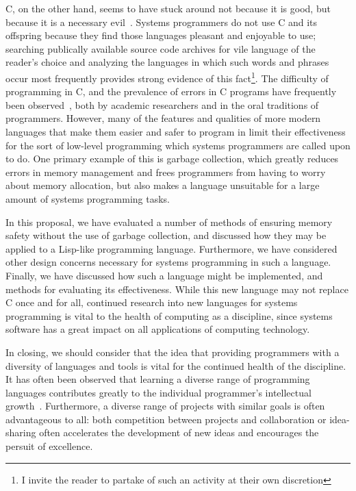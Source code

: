 \documentclass[11pt,a4paper]{article}
\theoremstyle{break}
\begin{document}
C, on the other hand, seems to have stuck around not because it is good, but because it is a necessary evil~\cite{Shapiro:2006:PLC:1215995.1216004}. Systems programmers do not use C and its offspring because they find those languages pleasant and enjoyable to use; searching publically available source code archives for vile language of the reader's choice and analyzing the languages in which such words and phrases occur most frequently provides strong evidence of this fact\footnote{I invite the reader to partake of such an activity at their own discretion}. The difficulty of programming in C, and the prevalence of errors in C programs have frequently been observed~\cite{Shapiro:2006:PLC:1215995.1216004,Bhattacharya:2011:APL:1985793.1985817,Ray:2014:LSS:2635868.2635922}, both by academic researchers and in the oral traditions of programmers. However, many of the features and qualities of more modern languages that make them easier and safer to program in limit their effectiveness for the sort of low-level programming which systems programmers are called upon to do. One primary example of this is garbage collection, which greatly reduces errors in memory management and frees programmers from having to worry about memory allocation, but also makes a language unsuitable for a large amount of systems programming tasks.

In this proposal, we have evaluated a number of methods of ensuring memory safety without the use of garbage collection, and discussed how they may be applied to a Lisp-like programming language. Furthermore, we have considered other design concerns necessary for systems programming in such a language. Finally, we have discussed how such a language might be implemented, and methods for evaluating its effectiveness. While this new language may not replace C once and for all, continued research into new languages for systems programming is vital to the health of computing as a discipline, since systems software has a great impact on all applications of computing technology.

In closing, we should consider that the idea that providing programmers with a diversity of languages and tools is vital for the continued health of the discipline. It has often been observed that learning a diverse range of programming languages contributes greatly to the individual programmer's intellectual growth~\cite{raymond2003become,norvig2001teach}. Furthermore, a diverse range of projects with similar goals is often advantageous to all: both competition between projects and collaboration or idea-sharing often accelerates the development of new ideas and encourages the persuit of excellence.

\pagebreak
\begingroup
\setlength{\emergencystretch}{1em} %
\printbibliography
\endgroup
\end{document}
